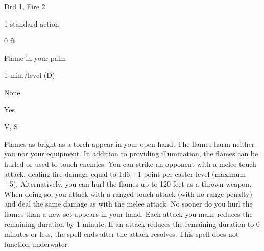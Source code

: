 
\begin{description*}
\item[Level:] Drd 1, Fire 2
\item[Casting Time:] 1 standard action
\item[Range:] 0 ft.
\item[Effect:] Flame in your palm
\item[Duration:] 1 min./level (D)
\item[Saving Throw:] None
\item[Spell Resistance:] Yes
\item[Components:] V, S
\end{description*}

Flames as bright as a torch appear in your open hand. The flames harm neither you
nor your equipment.
In addition to providing illumination, the flames can be hurled or used to touch
enemies. You can strike an opponent with a melee touch attack, dealing fire damage
equal to 1d6 +1 point per caster level (maximum +5). Alternatively, you can hurl
the flames up to 120 feet as a thrown weapon. When doing so, you attack with a
ranged touch attack (with no range penalty) and deal the same damage as with the
melee attack. No sooner do you hurl the flames than a new set appears in your hand.
Each attack you make reduces the remaining duration by 1 minute. If an attack reduces
the remaining duration to 0 minutes or less, the spell ends after the attack resolves.
This spell does not function underwater.
